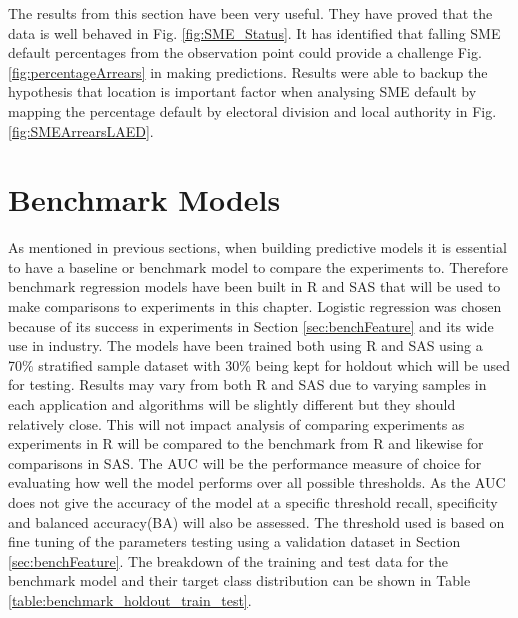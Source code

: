  
The results from this section have been very useful. They have proved that the data is well behaved in Fig. \ref{fig:SME_Status}. It has identified that falling SME default percentages from the observation point could provide a challenge Fig. \ref{fig:percentageArrears} in making predictions. Results were able to backup the hypothesis that location is important factor when analysing SME default by mapping the percentage default by electoral division and local authority in Fig. \ref{fig:SMEArrearsLAED}. 


\section{Benchmark Models}\label{sec:benchModels}
As mentioned in previous sections, when building predictive models it is essential to have a baseline or benchmark model to compare the experiments to. Therefore benchmark regression models have been built in R and SAS that will be used to make comparisons to experiments in this chapter. Logistic regression was chosen because of its success in experiments in Section \ref{sec:benchFeature} and its wide use in industry. The models have been trained both using R and SAS using a 70\% stratified sample dataset with 30\% being kept for holdout which will be used for testing. Results may vary from both R and SAS due to varying samples in each application and algorithms will be slightly different but they should relatively close. This will not impact analysis of comparing experiments as experiments in R will be compared to the benchmark from R and likewise for comparisons in SAS. The AUC will be the performance measure of choice for evaluating how well the model performs over all possible thresholds. As the AUC does not give the accuracy of the model at a specific threshold recall, specificity and balanced accuracy(BA) will also be assessed. The threshold used is based on fine tuning of the parameters testing using a validation dataset in Section \ref{sec:benchFeature}. The breakdown of the training and test data for the benchmark model and their target class distribution can be shown in Table \ref{table:benchmark_holdout_train_test}.

